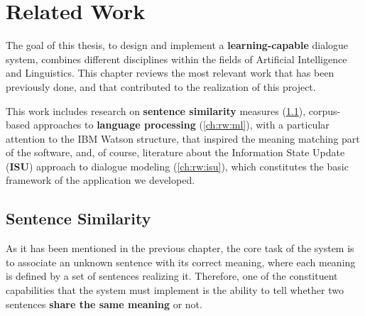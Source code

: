 
\chapter{Related Work} %

\label{ch:rw} %


The goal of this thesis, to design and implement a \textbf{learning-capable} dialogue system, combines different disciplines within the fields of Artificial Intelligence and Linguistics. This chapter reviews the most relevant work that has been previously done, and that contributed to the realization of this project.

This work includes research on \textbf{sentence similarity} measures (\ref{ch:rw:sim}), corpus-based approaches to \textbf{language processing} (\ref{ch:rw:ml}), with a particular attention to the IBM Watson structure, that inspired the meaning matching part of the software, and, of course, literature about the Information State Update (\textbf{ISU}) approach to dialogue modeling (\ref{ch:rw:isu}), which constitutes the basic framework of the application we developed.


\section{Sentence Similarity} \label{ch:rw:sim}
As it has been mentioned in the previous chapter, the core task of the system is to associate an unknown sentence with its correct meaning, where each meaning is defined by a set of sentences realizing it. Therefore, one of the constituent capabilities that the system must implement is the ability to tell whether two sentences \textbf{share the same meaning} or not.

